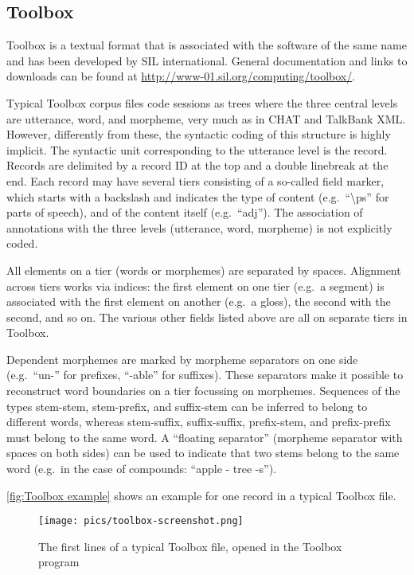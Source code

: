 \documentclass[a4paper, 11pt]{book}
\begin{document}
\subsection{Toolbox}
\label{subsec:Toolbox}

Toolbox is a textual format that is associated with the software of the same name and has been developed by SIL international. General documentation and links to downloads can be found at \url{http://www-01.sil.org/computing/toolbox/}. 

Typical Toolbox corpus files code sessions as trees where the three central levels are utterance, word, and morpheme, very much as in CHAT and TalkBank XML. However, differently from these, the syntactic coding of this structure is highly implicit. The syntactic unit corresponding to the utterance level is the record. Records are delimited by a record ID at the top and a double linebreak at the end. Each record may have several tiers consisting of a so-called field marker, which starts with a backslash and indicates the type of content (e.g.\ “\textbackslash ps” for parts of speech), and of the content itself (e.g.\ “adj”). The association of annotations with the three levels (utterance, word, morpheme) is not explicitly coded.

All elements on a tier (words or morphemes) are separated by spaces. Alignment across tiers works via indices: the first element on one tier (e.g.\ a segment) is associated with the first element on another (e.g.\ a gloss), the second with the second, and so on. The various other fields listed above are all on separate tiers in Toolbox.

Dependent morphemes are marked by morpheme separators on one side (e.g.\ “un-” for prefixes, “-able” for suffixes). These separators make it possible to reconstruct word boundaries on a tier focussing on morphemes. Sequences of the types stem-stem, stem-prefix, and suffix-stem can be inferred to belong to different words,  whereas stem-suffix, suffix-suffix, prefix-stem, and prefix-prefix must belong to the same word. A “floating separator” (morpheme separator with spaces on both sides) can be used to indicate that two stems belong to the same word (e.g.\ in the case of compounds: “apple - tree -s”). 

\autoref{fig:Toolbox example} shows an example for one record in a typical Toolbox file. 

\begin{figure}[ht!]
	\centering
	\texttt{[image: pics/toolbox-screenshot.png]}
	\caption{The first lines of a typical Toolbox file, opened in the Toolbox program}
	\label{fig:Toolbox example}
\end{figure}
\end{document}
